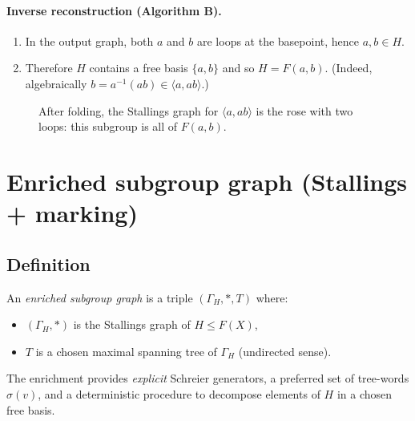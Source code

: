 \documentclass[11pt]{article}
\theoremstyle{definition}
\theoremstyle{plain}
\theoremstyle{remark}
\begin{document}
\paragraph{Inverse reconstruction (Algorithm B).}
\begin{enumerate}[leftmargin=2.2em]
\item In the output graph, both $a$ and $b$ are loops at the basepoint, hence $a,b\in H$.
\item Therefore $H$ contains a free basis $\{a,b\}$ and so $H=F(a,b)$.
(Indeed, algebraically $b=a^{-1}(ab)\in \langle a,ab\rangle$.)
\end{enumerate}

\begin{figure}[h]
\centering
{}
\caption{After folding, the Stallings graph for $\langle a,ab\rangle$ is the rose with two loops: this subgroup is all of $F(a,b)$.}
\end{figure}
\clearpage
\section{Enriched subgroup graph (Stallings + marking)}

\subsection*{Definition}
An \emph{enriched subgroup graph} is a triple $(\Gamma_H,*,T)$ where:
\begin{itemize}[leftmargin=2em]
\item $(\Gamma_H,*)$ is the Stallings graph of $H\le F(X)$,
\item $T$ is a chosen maximal spanning tree of $\Gamma_H$ (undirected sense).
\end{itemize}
The enrichment provides \emph{explicit} Schreier generators, a preferred set of tree-words $\sigma(v)$, and a deterministic procedure to decompose elements of $H$ in a chosen free basis.\cite{schreier1927,stallings1983}
\end{document}
